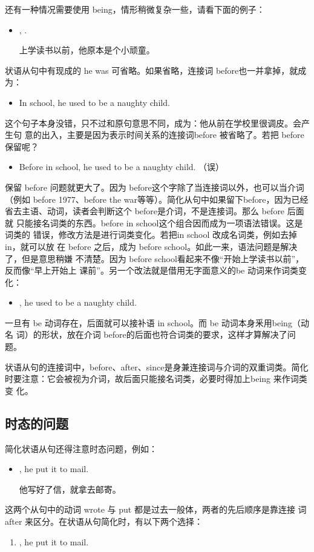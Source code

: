 还有一种情况需要使用 being，情形稍微复杂一些，请看下面的例子：
\begin{itemize}
\item {},   .

  上学读书以前，他原本是个小顽童。
\end{itemize}
状语从句中有现成的 he was 可省略。如果省略，连接词 before也一并拿掉，就成为：
\begin{itemize}
\item In school, he used to be a naughty child.
\end{itemize}
这个句子本身没错，只不过和原句意思不同，成为：他从前在学校里很调皮。会产生句
意的出入，主要是因为表示时间关系的连接词before 被省略了。若把 before 保留呢？
\begin{itemize}
\item Before in school, he used to be a naughty child. （误）
\end{itemize}
保留 before 问题就更大了。因为 before这个字除了当连接词以外，也可以当介词
（例如 before 1977、before the war等等）。简化从句中如果留下before，因为已经
省去主语、动词，读者会判断这个 before是介词，不是连接词。那么 before 后面就
只能接名词类的东西。before in school这个组合因而成为一项语法错误。这是词类的
错误，修改方法是进行词类变化。若把in school 改成名词类，例如去掉 in，就可以放
在 before 之后，成为 before school。如此一来，语法问题是解决了，但是意思稍嫌
不清楚。因为 before school看起来不像“开始上学读书以前”，反而像“早上开始上
课前”。另一个改法就是借用无字面意义的be 动词来作词类变化：
\begin{itemize}
\item {}, he used to be a naughty child.
\end{itemize}
一旦有 be 动词存在，后面就可以接补语 in school。而 be 动词本身釆用being（动名
词）的形状，放在介词 before的后面也符合词类的要求，这样才算解决了问题。

状语从句的连接词中，before、after、since是身兼连接词与介词的双重词类。简化
时要注意：它会被视为介词，故后面只能接名词类，必要时得加上being 来作词类变
化。

\subsection{时态的问题}

简化状语从句还得注意时态问题，例如：
\begin{itemize}
\item {}, he put it to mail.

  他写好了信，就拿去邮寄。
\end{itemize}
这两个从句中的动词 wrote 与 put 都是过去一般体，两者的先后顺序是靠连接
词after 来区分。在状语从句简化时，有以下两个选择：
\begin{enumerate}
\item {}, he put it to mail.
\end{enumerate}

